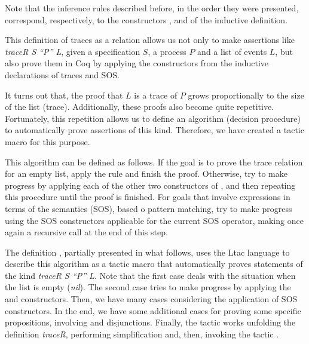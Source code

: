 Note that the inference rules described before, in the order they were presented, correspond, respectively, to the constructors  , and  of the  inductive definition.

This definition of traces as a relation allows us not only to make assertions like \emph{traceR S ``P'' L}, given a specification $ S $, a process $ P $ and a list of events $ L $, but also prove them in Coq by applying the constructors from the inductive declarations of traces and SOS.

It turns out that, the proof that $L$ is a trace of $P$ grows proportionally to the size of the list (trace). Additionally, these proofs also become quite repetitive. Fortunately, this repetition allows us to define an algorithm (decision procedure) to automatically prove assertions of this kind. Therefore, we have created a tactic macro for this purpose.

This algorithm can be defined as follows. If the goal is to prove the trace relation for an empty list, apply the rule  and finish the proof. Otherwise, try to make progress by applying each of the other two constructors of , and then repeating this procedure until the proof is finished. For goals that involve expressions in terms of the \CSPcoq{} semantics (SOS), based o pattern matching, try to make progress using the SOS constructors applicable for the current SOS operator, making once again a recursive call at the end of this step.

The definition , partially presented in what follows, uses the Ltac language to describe this algorithm as a tactic macro that automatically proves statements of the kind \emph{traceR S ``P'' L}. Note that the first case deals with the situation when the list is empty (\emph{nil}). The second case tries to make progress by applying the  and  constructors. Then, we have many cases considering the application of SOS constructors. In the end, we have some additional cases for proving some specific propositions, involving  and disjunctions. Finally, the tactic  works unfolding the definition \emph{traceR}, performing simplification and, then, invoking the tactic .

